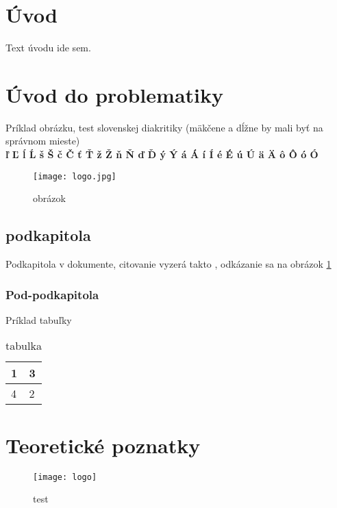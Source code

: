 \documentclass[12]{article}
\begin{document}
%


\newpage %
\tableofcontents
\newpage
\listoffigures
\newpage
\listoftables


\newpage
\pagestyle{fancy}
\setcounter{page}{1} %
\section*{Úvod} %
Text úvodu ide sem.

\newpage
\section{Úvod do problematiky}
Príklad obrázku, test slovenskej diakritiky (mäkčene a dĺžne by mali byť na správnom mieste) \\
\textbf{ľ Ľ ĺ Ĺ š Š č Č ť Ť ž Ž ň Ň ď Ď ý Ý á Á í Í é É ú Ú ä Ä ô Ô ó Ó}
\begin{figure}[H] %
\centering
\texttt{[image: logo.jpg]}
\caption{obrázok}
\label{img:obrazok}
\end{figure}
\subsection{podkapitola}
Podkapitola v dokumente, citovanie vyzerá takto \cite{modernrob}, odkázanie sa na obrázok \ref{img:obrazok}
\subsubsection{Pod-podkapitola}
Príklad tabuľky
\begin{table}[H]
	\centering
	\caption{tabulka}
	\label{tab:my-table}
	\begin{tabular}{|l|l|}
		\hline
		1 & 3 \\ \hline
		4 & 2 \\ \hline
	\end{tabular}
\end{table}
\section{Teoretické poznatky}
\begin{figure}[H] %
\centering
\texttt{[image: logo]}
\caption{test}
\label{img:test}
\end{figure}
\end{document}
